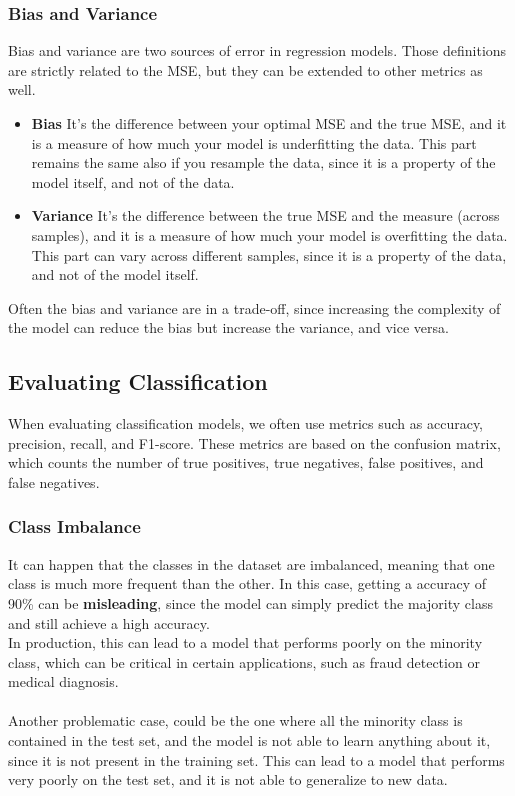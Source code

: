 \subsubsection{Bias and Variance}
Bias and variance are two sources of error in regression models.
Those definitions are strictly related to the MSE, but they can be extended to other metrics as well.
\begin{itemize}
    \item \textbf{Bias} It's the difference between your optimal MSE and the true MSE, and it is a measure of how much your model is underfitting the data.
    This part remains the same also if you resample the data, since it is a property of the model itself, and not of the data.
    \item \textbf{Variance} It's the difference between the true MSE and the measure (across samples), and it is a measure of how much your model is overfitting the data.
    This part can vary across different samples, since it is a property of the data, and not of the model itself.
\end{itemize}
Often the bias and variance are in a trade-off, since increasing the complexity of the model can reduce the bias but increase the variance, and vice versa.

\subsection{Evaluating Classification}
When evaluating classification models, we often use metrics such as accuracy, precision, recall, and F1-score.
These metrics are based on the confusion matrix, which counts the number of true positives, true negatives, false positives, and false negatives.

\subsubsection{Class Imbalance}
It can happen that the classes in the dataset are imbalanced, meaning that one class is much more frequent than the other.
In this case, getting a accuracy of 90\% can be \textbf{misleading}, since the model can simply predict the majority class and still achieve a high accuracy.
\\
In production, this can lead to a model that performs poorly on the minority class, which can be critical in certain applications, such as fraud detection or medical diagnosis.
\\\\
Another problematic case, could be the one where all the minority class is contained in the test set, and the model is not able to learn anything about it, since it is not present in the training set.
This can lead to a model that performs very poorly on the test set, and it is not able to generalize to new data.

